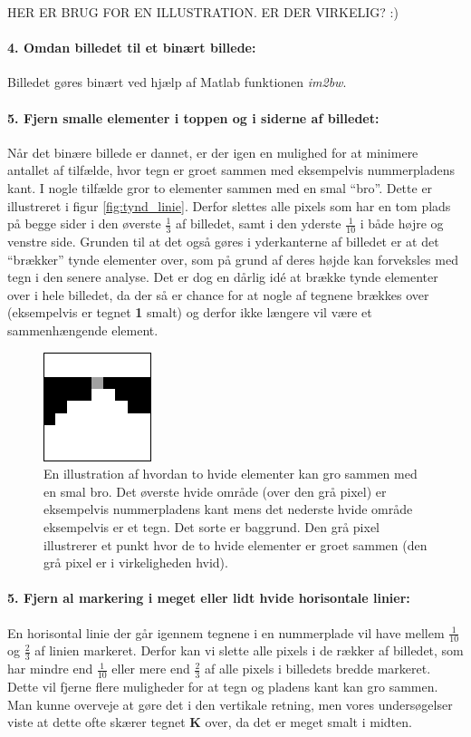 HER ER BRUG FOR EN ILLUSTRATION. ER DER VIRKELIG? :)

\paragraph{4. Omdan billedet til et binært billede:} Billedet gøres binært ved hjælp af Matlab funktionen \textit{im2bw}.

\paragraph{5. Fjern smalle elementer i toppen og i siderne af billedet:}
Når det binære billede er dannet, er der igen en mulighed for at minimere antallet af tilfælde, hvor tegn er groet sammen med eksempelvis nummerpladens kant. I nogle tilfælde gror to elementer sammen med en smal ``bro''. Dette er illustreret i figur \vref{fig:tynd_linie}. Derfor slettes alle pixels som har en tom plads på begge sider i den øverste $\frac{1}{3}$ af billedet, samt i den yderste $\frac{1}{10}$ i både højre og venstre side. Grunden til at det også gøres i yderkanterne af billedet er at det ``brækker'' tynde elementer over, som på grund af deres højde kan forveksles med tegn i den senere analyse. Det er dog en dårlig idé at brække tynde elementer over i hele billedet, da der så er chance for at nogle af tegnene brækkes over (eksempelvis er tegnet \textbf{1} smalt) og derfor ikke længere vil være et sammenhængende element.

\begin{figure}[htp]
\centering
\includegraphics{implementation/illu/cc_remove_thin_line.png} 
\caption{En illustration af hvordan to hvide elementer kan gro sammen med en smal bro. Det øverste hvide område (over den grå pixel) er eksempelvis nummerpladens kant mens det nederste hvide område eksempelvis er et tegn. Det sorte er baggrund. Den grå pixel illustrerer et punkt hvor de to hvide elementer er groet sammen (den grå pixel er i virkeligheden hvid).}
\label{fig:tynd_linie}
\end{figure}

\paragraph{5. Fjern al markering i meget eller lidt hvide horisontale linier:} En horisontal linie der går igennem tegnene i en nummerplade vil have mellem $\frac{1}{10}$ og $\frac{2}{3}$ af linien markeret. Derfor kan vi slette alle pixels i de rækker af billedet, som har mindre end $\frac{1}{10}$ eller mere end $\frac{2}{3}$ af alle pixels i billedets bredde markeret. Dette vil fjerne flere muligheder for at tegn og pladens kant kan gro sammen. Man kunne overveje at gøre det i den vertikale retning, men vores undersøgelser viste at dette ofte skærer tegnet \textbf{K} over, da det er meget smalt i midten.


